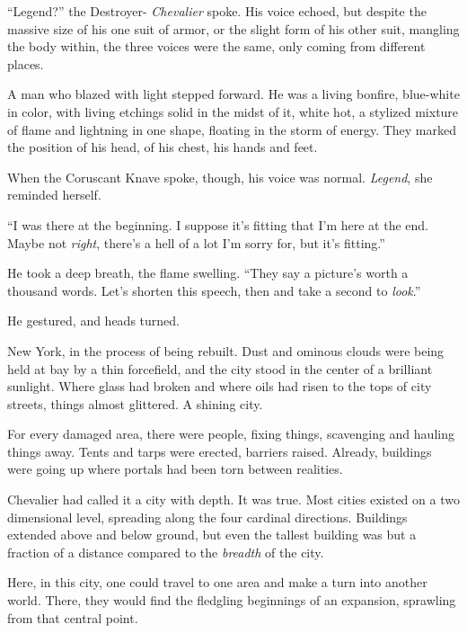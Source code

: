 ``Legend?'' the Destroyer- \emph{Chevalier} spoke.  His voice echoed, but despite the massive size of his one suit of armor, or the slight form of his other suit, mangling the body within, the three voices were the same, only coming from different places.



A man who blazed with light stepped forward.  He was a living bonfire, blue-white in color, with living etchings solid in the midst of it, white hot, a stylized mixture of flame and lightning in one shape, floating in the storm of energy.  They marked the position of his head, of his chest, his hands and feet.



When the Coruscant Knave spoke, though, his voice was normal.  \emph{Legend}, she reminded herself.



``I was there at the beginning.  I suppose it's fitting that I'm here at the end.  Maybe not \emph{right}, there's a hell of a lot I'm sorry for, but it's fitting.''



He took a deep breath, the flame swelling.  ``They say a picture's worth a thousand words.  Let's shorten this speech, then and take a second to \emph{look}.''



He gestured, and heads turned.



New York, in the process of being rebuilt.  Dust and ominous clouds were being held at bay by a thin forcefield, and the city stood in the center of a brilliant sunlight.  Where glass had broken and where oils had risen to the tops of city streets, things almost glittered.  A shining city.



For every damaged area, there were people, fixing things, scavenging and hauling things away.  Tents and tarps were erected, barriers raised.  Already, buildings were going up where portals had been torn between realities.



Chevalier had called it a city with depth.  It was true.  Most cities existed on a two dimensional level, spreading along the four cardinal directions.  Buildings extended above and below ground, but even the tallest building was but a fraction of a distance compared to the \emph{breadth} of the city.



Here, in this city, one could travel to one area and make a turn into another world.  There, they would find the fledgling beginnings of an expansion, sprawling from that central point.



